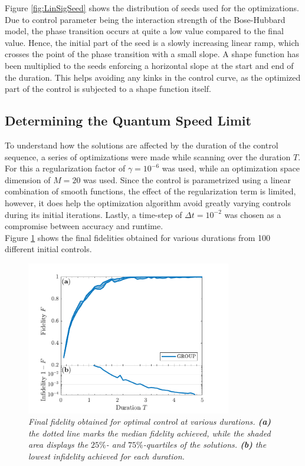 Figure \ref{fig:LinSigSeed} shows the distribution of seeds used for the optimizations. Due to control parameter being the interaction strength of the Bose-Hubbard model, the phase transition occurs at quite a low value compared to the final value. Hence, the initial part of the seed is a slowly increasing linear ramp, which crosses the point of the phase transition with a small slope. A shape function has been multiplied to the seeds enforcing a horizontal slope at the start and end of the duration. This helps avoiding any kinks in the control curve, as the optimized part of the control is subjected to a shape function itself.


\subsection{Determining the Quantum Speed Limit}
To understand how the solutions are affected by the duration of the control sequence, a series of optimizations were made while scanning over the duration $T$. For this a regularization factor of $\gamma = 10^{-6}$ was used, while an optimization space dimension of $M = 20$ was used. Since the control is parametrized using a linear combination of smooth functions, the effect of the regularization term is limited, however, it does help the optimization algorithm avoid greatly varying controls during its initial iterations. Lastly, a time-step of $\Delta t = 10^{-2}$ was chosen as a compromise between accuracy and runtime.\\
Figure \ref{fig:FidelityDuration5} shows the final fidelities obtained for various durations from 100 different initial controls.
\begin{figure}[h!]
    \centering
    \includegraphics[width=0.8\textwidth]{Figures/5part/FidelityDuration.pdf}
    \caption{\textit{Final fidelity obtained for optimal control at various durations. \textbf{(a)} the dotted line marks the median fidelity achieved, while the shaded area displays the $25\%$- and $75\%$-quartiles of the solutions. \textbf{(b)} the lowest infidelity achieved for each duration. }}
    \label{fig:FidelityDuration5}
\end{figure}
